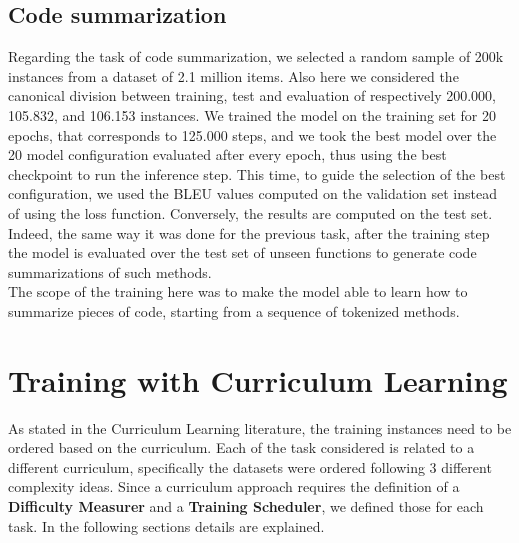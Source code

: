 \subsection{Code summarization}
Regarding the task of code summarization, we selected a random sample of 200k instances from a dataset of 2.1 million items.
Also here we considered the canonical division between training, test and evaluation of respectively 200.000, 105.832, and 106.153 instances.
We trained the model on the training set for 20 epochs, that corresponds to 125.000 steps, and we took the best model over the 20 model configuration evaluated after every epoch,
thus using the best checkpoint to run the inference step. This time, to guide the selection of the best configuration, we used the BLEU values computed on the validation set instead of using
the loss function. Conversely, the results are computed on the test set. Indeed, the same way it was done for the previous task, after the training step the model is
evaluated over the test set of unseen functions to generate code summarizations of such methods.\\
The scope of the training here 
was to make the model able to learn how to summarize pieces of code, starting from a sequence of tokenized methods.

\section{Training with Curriculum Learning}

As stated in the Curriculum Learning literature, the training instances need to be ordered based on the curriculum.
Each of the task considered is related to a different curriculum, specifically the datasets were ordered
following 3 different complexity ideas. Since a curriculum approach requires the definition of a \textbf{Difficulty Measurer}
and a \textbf{Training Scheduler}, we defined those for each task. In the following sections details are explained.

